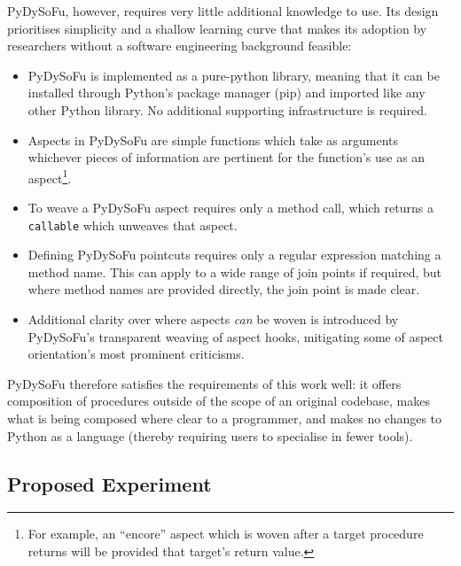 PyDySoFu, however, requires very little additional knowledge to use. Its design
prioritises simplicity and a shallow learning curve that makes its adoption by
researchers without a software engineering background feasible: 

\begin{itemize}
    \item PyDySoFu is implemented as a pure-python library, meaning that it can
    be installed through Python's package manager (pip) and imported like any
    other Python library. No additional supporting infrastructure is required.
    \item Aspects in PyDySoFu are simple functions which take as arguments
    whichever pieces of information are pertinent for the function's use as an
    aspect\footnote{For example, an ``encore'' aspect which is woven after a
    target procedure returns will be provided that target's return value.}.
    \item To weave a PyDySoFu aspect requires only a method call, which returns a
    \lstinline{callable} which unweaves that aspect.
    \item Defining PyDySoFu pointcuts requires only a regular expression
    matching a method name. This can apply to a wide range of join points if
    required, but where method names are provided directly, the join point is
    made clear.
    \item Additional clarity over where aspects \emph{can} be woven is
    introduced by PyDySoFu's transparent weaving of aspect hooks, mitigating
    some of aspect orientation's most prominent criticisms.
\end{itemize}

PyDySoFu therefore satisfies the requirements of this work well: it offers
composition of procedures outside of the scope of an original codebase, makes
what is being composed where clear to a programmer, and makes no
changes to Python as a language (thereby requiring users to specialise in fewer
tools). 


\subsection{Proposed Experiment}\label{subsec:optimisation_with_aspects_experiment}

